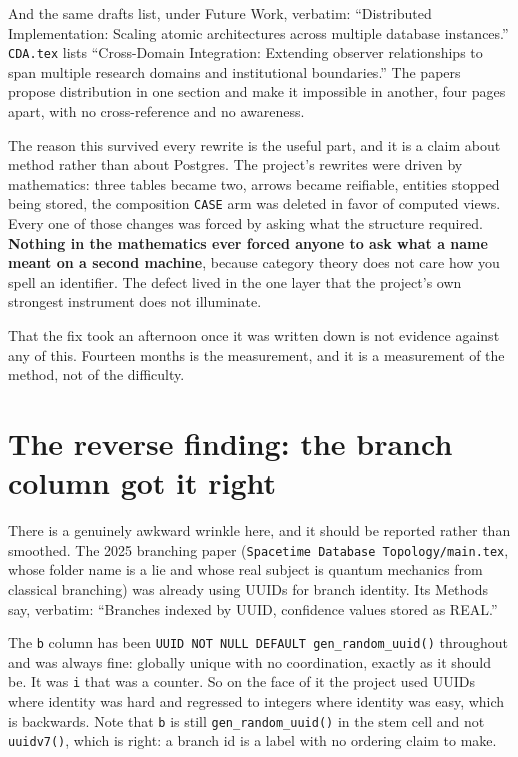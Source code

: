 And the same drafts list, under Future Work, verbatim: ``Distributed Implementation: Scaling atomic architectures across multiple database instances.'' \texttt{CDA.tex} lists ``Cross-Domain Integration: Extending observer relationships to span multiple research domains and institutional boundaries.'' The papers propose distribution in one section and make it impossible in another, four pages apart, with no cross-reference and no awareness.

The reason this survived every rewrite is the useful part, and it is a claim about method rather than about Postgres. The project's rewrites were driven by mathematics: three tables became two, arrows became reifiable, entities stopped being stored, the composition \texttt{CASE} arm was deleted in favor of computed views. Every one of those changes was forced by asking what the structure required. \textbf{Nothing in the mathematics ever forced anyone to ask what a name meant on a second machine}, because category theory does not care how you spell an identifier. The defect lived in the one layer that the project's own strongest instrument does not illuminate.

That the fix took an afternoon once it was written down is not evidence against any of this. Fourteen months is the measurement, and it is a measurement of the method, not of the difficulty.

\section{The reverse finding: the branch column got it right}

There is a genuinely awkward wrinkle here, and it should be reported rather than smoothed. The 2025 branching paper (\texttt{Spacetime Database Topology/main.tex}, whose folder name is a lie and whose real subject is quantum mechanics from classical branching) was already using UUIDs for branch identity. Its Methods say, verbatim: ``Branches indexed by UUID, confidence values stored as REAL.''

The \texttt{b} column has been \texttt{UUID NOT NULL DEFAULT gen\_random\_uuid()} throughout and was always fine: globally unique with no coordination, exactly as it should be. It was \texttt{i} that was a counter. So on the face of it the project used UUIDs where identity was hard and regressed to integers where identity was easy, which is backwards. Note that \texttt{b} is still \texttt{gen\_random\_uuid()} in the stem cell and not \texttt{uuidv7()}, which is right: a branch id is a label with no ordering claim to make.

